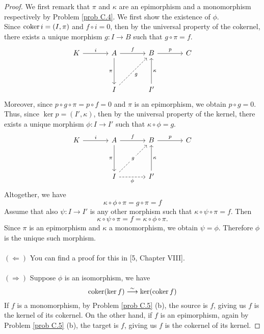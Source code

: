 \begin{proof}
We first remark that $\pi$ and $\kappa$ are an epimorphism and a monomorphism respectively by Problem \ref{prob C.4}. We first show the existence of $\phi$.\\[0.5em]
Since $\operatorname{coker} i = (I, \pi)$ and $f\circ i = 0$, then by the universal property of the cokernel, there exists a unique morphism $g: I \to B$ such that $g \circ \pi = f$.
\[\begin{tikzcd}[row sep=huge, column sep = large]
K \arrow[r, "i"] & A \arrow[r, "f"] \arrow[d, "\pi"'] & B \arrow[r, "p"]        & C \\
                 & I \arrow[ru, "g"', dashed]          & I' \arrow[u, "\kappa"'] &  
\end{tikzcd}\]
Moreover, since $p\circ g \circ \pi = p\circ f = 0$ and $\pi$ is an epimorphism, we obtain $p \circ g = 0$. Thus, since $\ker p = (I', \kappa)$, then by the universal property of the kernel, there exists a unique morphism $\phi: I \to I'$ such that $\kappa \circ \phi = g$.
\[\begin{tikzcd}[row sep=huge, column sep = large]
K \arrow[r, "i"] & A \arrow[r, "f"] \arrow[d, "\pi"'] & B \arrow[r, "p"]        & C \\
                 & I \arrow[ru, "g"' description, dashed]  \arrow[r, "\phi"', dashed]         & I' \arrow[u, "\kappa"'] &  
\end{tikzcd}\]
Altogether, we have
\[\kappa\circ\phi\circ \pi = g\circ \pi = f\]
Assume that also $\psi : I \to I'$ is any other morphism such that $\kappa \circ \psi \circ \pi = f$. Then \[\kappa \circ \psi \circ \pi = f = \kappa \circ \phi \circ \pi.\]
Since $\pi$ is an epimorphism and $\kappa$ a monomorphism, we obtain $\psi = \phi$. Therefore $\phi$ is the unique such morphism.\\
\\
$(\Leftarrow)$ You can find a proof for this in [5, Chapter VIII]. %
\\
\\
$(\Rightarrow)$ Suppose $\phi$ is an isomorphism, we have 
\[\operatorname{coker}(\ker f) \overset{\sim}{\longrightarrow} \ker(\operatorname{coker} f)\]
If $f$ is a monomorphism, by Problem \ref{prob C.5} (b), the source is $f$, giving us $f$ is the kernel of its cokernel. On the other hand, if $f$ is an epimorphism, again by Problem \ref{prob C.5} (b), the target is $f$, giving us $f$ is the cokernel of its kernel.
\end{proof}

\vspace*{0.1in}


